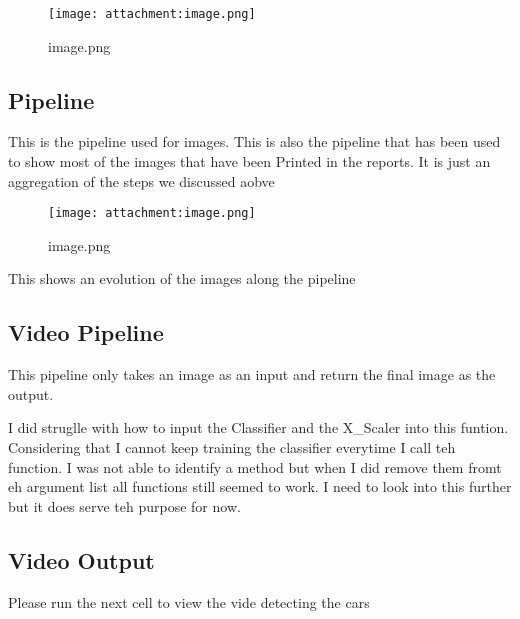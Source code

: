 \documentclass[11pt]{article}
\makeatletter
\def\maxwidth{\ifdim\Gin@nat@width>\linewidth\linewidth
    \else\Gin@nat@width\fi}
\let\Oldincludegraphics\includegraphics
\renewcommand{\includegraphics}[1]{\Oldincludegraphics[width=.8\maxwidth]{#1}}
\makeatother
\begin{document}
\begin{figure}
\centering
\texttt{[image: attachment:image.png]}
\caption{image.png}
\end{figure}

    \hypertarget{pipeline}{%
\subsection{Pipeline}\label{pipeline}}

This is the pipeline used for images. This is also the pipeline that has
been used to show most of the images that have been Printed in the
reports. It is just an aggregation of the steps we discussed aobve

\begin{figure}
\centering
\texttt{[image: attachment:image.png]}
\caption{image.png}
\end{figure}

This shows an evolution of the images along the pipeline

    \hypertarget{video-pipeline}{%
\subsection{Video Pipeline}\label{video-pipeline}}

This pipeline only takes an image as an input and return the final image
as the output.

I did struglle with how to input the Classifier and the X\_Scaler into
this funtion. Considering that I cannot keep training the classifier
everytime I call teh function. I was not able to identify a method but
when I did remove them fromt eh argument list all functions still seemed
to work. I need to look into this further but it does serve teh purpose
for now.

    \hypertarget{video-output}{%
\subsection{Video Output}\label{video-output}}

Please run the next cell to view the vide detecting the cars
\end{document}
